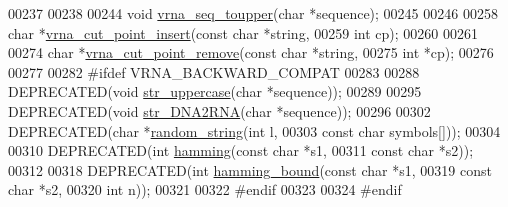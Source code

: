 \begin{DoxyCode}
00237 
00238 
00244 \textcolor{keywordtype}{void} \hyperlink{group__string__utils_ga4f44dca03c9d708d68e64c0610bb9091}{vrna\_seq\_toupper}(\textcolor{keywordtype}{char} *sequence);
00245 
00246 
00258 \textcolor{keywordtype}{char} *\hyperlink{group__string__utils_ga74f05ece32ea73b59f84a7452afd5fae}{vrna\_cut\_point\_insert}(\textcolor{keyword}{const} \textcolor{keywordtype}{char}  *\textcolor{keywordtype}{string},
00259                             \textcolor{keywordtype}{int}         cp);
00260 
00261 
00274 \textcolor{keywordtype}{char} *\hyperlink{group__string__utils_ga1fbd821d4408cc5f1dd9d12c15e092cb}{vrna\_cut\_point\_remove}(\textcolor{keyword}{const} \textcolor{keywordtype}{char}  *\textcolor{keywordtype}{string},
00275                             \textcolor{keywordtype}{int}         *cp);
00276 
00277 
00282 \textcolor{preprocessor}{#ifdef  VRNA\_BACKWARD\_COMPAT}
00283 
00288 DEPRECATED(\textcolor{keywordtype}{void}  \hyperlink{string__utils_8h_a17b796b806f96b70382077fb5bc519bb}{str\_uppercase}(\textcolor{keywordtype}{char} *sequence));
00289 
00295 DEPRECATED(\textcolor{keywordtype}{void} \hyperlink{string__utils_8h_ad3f18dd83f958f18b2f26ecb99305208}{str\_DNA2RNA}(\textcolor{keywordtype}{char} *sequence));
00296 
00302 DEPRECATED(\textcolor{keywordtype}{char} *\hyperlink{string__utils_8h_a1b95eac365a021572e1c37e5993a89be}{random\_string}(\textcolor{keywordtype}{int}        l,
00303                                \textcolor{keyword}{const} \textcolor{keywordtype}{char} symbols[]));
00304 
00310 DEPRECATED(\textcolor{keywordtype}{int} \hyperlink{string__utils_8h_ad9dc7bfc9aa664dc6698f17ce07fc7e7}{hamming}(\textcolor{keyword}{const} \textcolor{keywordtype}{char} *s1,
00311                        \textcolor{keyword}{const} \textcolor{keywordtype}{char} *s2));
00312 
00318 DEPRECATED(\textcolor{keywordtype}{int} \hyperlink{string__utils_8h_a96d3c36717d624514055ce201cab1542}{hamming\_bound}(\textcolor{keyword}{const} \textcolor{keywordtype}{char} *s1,
00319                              \textcolor{keyword}{const} \textcolor{keywordtype}{char} *s2,
00320                              \textcolor{keywordtype}{int}        n));
00321 
00322 \textcolor{preprocessor}{#endif}
00323 
00324 \textcolor{preprocessor}{#endif}
\end{DoxyCode}
